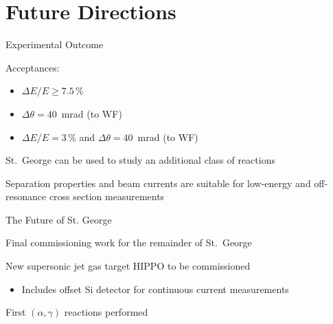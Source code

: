 \documentclass[10pt]{beamer}
\begin{document}


\section{Future Directions}

\begin{frame}[fragile]{Experimental Outcome}

    Acceptances:
    \begin{itemize}
        \item $\Delta E/E \geq 7.5$\,\%
        \item $\Delta\theta = 40$~mrad (to WF)
        \item $\Delta E/E = 3$\,\% and $\Delta\theta = 40$~mrad (to WF)
    \end{itemize}

    St.\ George can be used to study an additional class of reactions

    Separation properties and beam currents are suitable for low-energy
    and off-resonance cross section measurements

\end{frame}

\begin{frame}[fragile]{The Future of St. George}

    Final commissioning work for the remainder of St.\ George

    New supersonic jet gas target HIPPO to be commissioned
    \begin{itemize}
        \item Includes offset Si detector for continuous current
            measurements
    \end{itemize}

    First $(\alpha,\gamma)$ reactions performed

\end{frame}

\maketitle

\appendix

\end{document}
